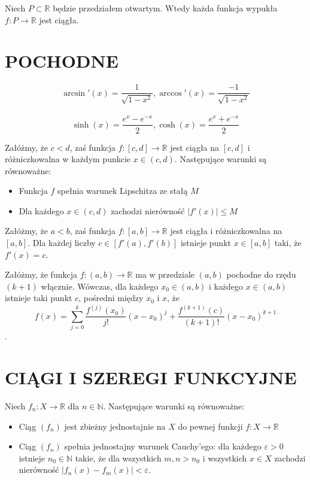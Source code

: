 \documentclass[12pt]{article}
\newcommand{\N}{\mathbb{N}}
\newcommand{\R}{\mathbb{R}}
\begin{document}
\theorem{}
Niech $P \subset \R$ będzie przedziałem otwartym. Wtedy każda funkcja
wypukła $f : P \rightarrow \R$ jest ciągła.

\section*{POCHODNE}

$$\arcsin'(x) = \frac{1}{\sqrt{1 - x^2}},\arccos'(x) = \frac{-1}{\sqrt{1 - x^2}}$$ \\
$$\sinh(x) = \frac{e^x - e^{-x}}{2}, \cosh(x) = \frac{e^x + e^{-x}}{2}$$

\theorem{}
Załóżmy, że $c < d$, zaś funkcja $f : [c, d] \rightarrow \R$ jest ciągła na $[c, d]$ i różniczkowalna w każdym punkcie $x \in (c, d)$. Następujące warunki są równoważne:
\begin{itemize}
    \item Funkcja $f$ spełnia warunek Lipschitza ze stałą $M$
    \item Dla każdego $x \in (c, d)$ zachodzi nierówność $|f'(x)| \leq M$
\end{itemize}

Załóżmy, że $a < b$, zaś funkcja
$f : [a, b] \rightarrow \R$ jest ciągła i różniczkowalna na $[a, b]$. Dla każdej liczby $c \in [f'(a), f'(b)]$ istnieje
punkt $x \in [a, b]$ taki, że $f'(x) = c$.

Załóżmy, że funkcja $f : (a, b) \rightarrow \R$
ma w przedziale $(a, b)$ pochodne do rzędu $(k+1)$ włącznie. Wówczas, dla każdego $x_0 \in (a, b)$
i każdego $x \in (a, b)$ istnieje taki punkt $c$, pośredni między $x_0$ i $x$, że
$$f(x) = \sum_{j=0}^k \frac{f^{(j)}(x_0)}{j!} (x - x_0)^j + \frac{f^{(k+1)}(c)}{(k + 1)!} (x - x_0)^{k+1}$$.

\section*{CIĄGI I SZEREGI FUNKCYJNE}

\theorem{}
Niech $f_n : X \rightarrow \R$ dla $n \in \N$. Następujące warunki są równoważne:
\begin{itemize}
    \item Ciąg $(f_n)$ jest zbieżny jednostajnie na $X$ do pewnej funkcji $f : X \rightarrow \R$
    \item Ciąg $(f_n)$ spełnia jednostajny warunek Cauchy’ego: dla każdego $\varepsilon > 0$ istnieje $n_0 \in \N$ takie, że dla wszystkich $m, n > n_0$ i wszystkich $x \in X$ zachodzi nierówność $|f_n(x) - f_m(x)| < \varepsilon$.
\end{itemize}
\end{document}
